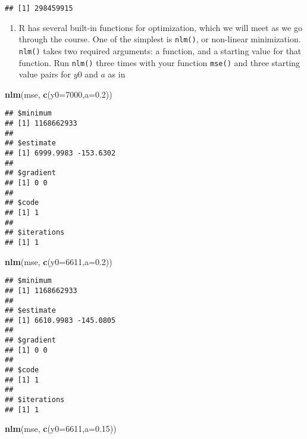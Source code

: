 \documentclass[
]{article}
\newenvironment{Shaded}{\begin{snugshade}}{\end{snugshade}}
\newcommand{\DataTypeTok}[1]{\textcolor[rgb]{0.13,0.29,0.53}{#1}}
\newcommand{\DecValTok}[1]{\textcolor[rgb]{0.00,0.00,0.81}{#1}}
\newcommand{\FloatTok}[1]{\textcolor[rgb]{0.00,0.00,0.81}{#1}}
\newcommand{\KeywordTok}[1]{\textcolor[rgb]{0.13,0.29,0.53}{\textbf{#1}}}
\newcommand{\NormalTok}[1]{#1}
\providecommand{\tightlist}{%
  \setlength{\itemsep}{0pt}\setlength{\parskip}{0pt}}
\begin{document}
\begin{verbatim}
## [1] 298459915
\end{verbatim}

\begin{enumerate}
\def\labelenumi{\arabic{enumi}.}
\setcounter{enumi}{2}
\tightlist
\item
  R has several built-in functions for optimization, which we will meet
  as we go through the course. One of the simplest is \texttt{nlm()}, or
  non-linear minimization. \texttt{nlm()} takes two required arguments:
  a function, and a starting value for that function. Run \texttt{nlm()}
  three times with your function \texttt{mse()} and three starting value
  pairs for \(y0\) and \(a\) as in
\end{enumerate}

\begin{Shaded}
\begin{Highlighting}[]
\KeywordTok{nlm}\NormalTok{(mse, }\KeywordTok{c}\NormalTok{(}\DataTypeTok{y0=}\DecValTok{7000}\NormalTok{,}\DataTypeTok{a=}\FloatTok{0.2}\NormalTok{))}
\end{Highlighting}
\end{Shaded}

\begin{verbatim}
## $minimum
## [1] 1168662933
## 
## $estimate
## [1] 6999.9983 -153.6302
## 
## $gradient
## [1] 0 0
## 
## $code
## [1] 1
## 
## $iterations
## [1] 1
\end{verbatim}

\begin{Shaded}
\begin{Highlighting}[]
\KeywordTok{nlm}\NormalTok{(mse, }\KeywordTok{c}\NormalTok{(}\DataTypeTok{y0=}\DecValTok{6611}\NormalTok{,}\DataTypeTok{a=}\FloatTok{0.2}\NormalTok{))}
\end{Highlighting}
\end{Shaded}

\begin{verbatim}
## $minimum
## [1] 1168662933
## 
## $estimate
## [1] 6610.9983 -145.0805
## 
## $gradient
## [1] 0 0
## 
## $code
## [1] 1
## 
## $iterations
## [1] 1
\end{verbatim}

\begin{Shaded}
\begin{Highlighting}[]
\KeywordTok{nlm}\NormalTok{(mse, }\KeywordTok{c}\NormalTok{(}\DataTypeTok{y0=}\DecValTok{6611}\NormalTok{,}\DataTypeTok{a=}\FloatTok{0.15}\NormalTok{))}
\end{Highlighting}
\end{Shaded}
\end{document}
